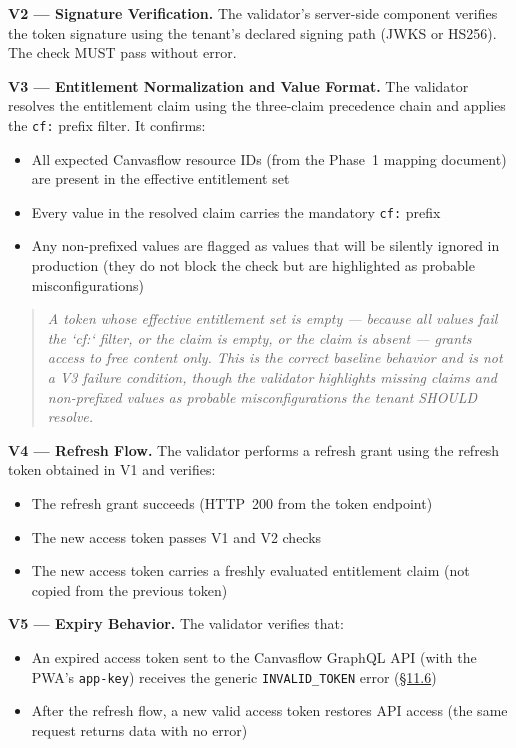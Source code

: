 \textbf{V2 --- Signature Verification.} The validator's server-side component verifies
the token signature using the tenant's declared signing path (JWKS or HS256). The check
MUST pass without error.

\textbf{V3 --- Entitlement Normalization and Value Format.} The validator resolves the
entitlement claim using the three-claim precedence chain and applies the \texttt{cf:}
prefix filter. It confirms:
\begin{itemize}
  \item All expected Canvasflow resource IDs (from the Phase~1 mapping document) are
    present in the effective entitlement set
  \item Every value in the resolved claim carries the mandatory \texttt{cf:} prefix
  \item Any non-prefixed values are flagged as values that will be silently ignored in
    production (they do not block the check but are highlighted as 
    probable misconfigurations)
\end{itemize}

\begin{quote}
  \textit{A token whose effective entitlement set is empty — because all values 
  fail the `cf:` filter, or the claim is empty, or the claim is absent — 
  grants access to free content only. This is the correct baseline behavior 
  and is not a V3 failure condition, though the validator highlights missing 
  claims and non-prefixed values as probable misconfigurations the tenant 
  SHOULD resolve.}
\end{quote}

\textbf{V4 --- Refresh Flow.} The validator performs a refresh grant using the refresh
token obtained in V1 and verifies:
\begin{itemize}
  \item The refresh grant succeeds (HTTP~200 from the token endpoint)
  \item The new access token passes V1 and V2 checks
  \item The new access token carries a freshly evaluated entitlement claim (not copied
    from the previous token)
\end{itemize}

\textbf{V5 --- Expiry Behavior.} The validator verifies that:
\begin{itemize}
  \item An expired access token sent to the Canvasflow GraphQL API (with the PWA's
    \texttt{app-key}) receives the generic \texttt{INVALID\_TOKEN} error
    (\hyperref[sec:generic-error-responses]{\S11.6})
  \item After the refresh flow, a new valid access token restores API access (the same
    request returns data with no error)
\end{itemize}

